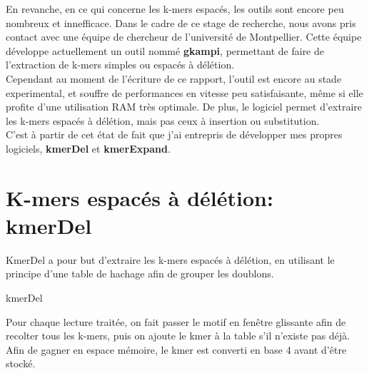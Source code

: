 \documentclass{report}
\begin{document}
      En revanche, en ce qui concerne les k-mers espacés, les outils sont encore peu nombreux et innefficace.
      Dans le cadre de ce stage de recherche, nous avons pris contact avec une équipe de chercheur de l'université de Montpellier. Cette équipe développe actuellement un outil nommé \textbf{gkampi}, permettant de faire de l'extraction de k-mers simples ou espacés à délétion.\\

      Cependant au moment de l'écriture de ce rapport, l'outil est encore au stade experimental, et souffre de performances en vitesse peu satisfaisante, même si elle profite d'une utilisation RAM très optimale. De plus, le logiciel permet d'extraire les k-mers espacés à délétion, mais pas ceux à insertion ou substitution.\\

      C'est à partir de cet état de fait que j'ai entrepris de développer mes propres logiciels, \textbf{kmerDel} et \textbf{kmerExpand}.
  \chapter{K-mers espacés à délétion: kmerDel}
    KmerDel a pour but d'extraire les k-mers espacés à délétion, en utilisant le principe d'une table de hachage afin de grouper les doublons.\bigskip\\
    \normalsize
    \begin{algorithm}[H]{
      \caption{kmerDel}
    }\end{algorithm}
    \large
    Pour chaque lecture traitée, on fait passer le motif en fenêtre glissante afin de recolter tous les k-mers, puis on ajoute le kmer à la table s'il n'existe pas déjà. Afin de gagner en espace mémoire, le kmer est converti en base 4 avant d'être stocké.\\
\end{document}
